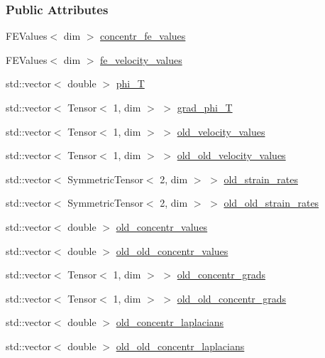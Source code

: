 \subsubsection*{Public Attributes}
\begin{DoxyCompactItemize}
\item 
F\+E\+Values$<$ dim $>$ \hyperlink{struct_assembly_1_1_scratch_1_1concentr_r_h_s_a9bc67b73e78fc8615584d194c3b85106}{concentr\+\_\+fe\+\_\+values}
\item 
F\+E\+Values$<$ dim $>$ \hyperlink{struct_assembly_1_1_scratch_1_1concentr_r_h_s_ad2de28d5b653c8ee22e96ea33c32c55a}{fe\+\_\+velocity\+\_\+values}
\item 
std\+::vector$<$ double $>$ \hyperlink{struct_assembly_1_1_scratch_1_1concentr_r_h_s_acba65db7ab7aece30027901e3b0f030a}{phi\+\_\+\+T}
\item 
std\+::vector$<$ Tensor$<$ 1, dim $>$ $>$ \hyperlink{struct_assembly_1_1_scratch_1_1concentr_r_h_s_a6168fae7e16f02fb680dd33d4adf7b3c}{grad\+\_\+phi\+\_\+\+T}
\item 
std\+::vector$<$ Tensor$<$ 1, dim $>$ $>$ \hyperlink{struct_assembly_1_1_scratch_1_1concentr_r_h_s_a387df4b1d77c791fa36096d021da90b0}{old\+\_\+velocity\+\_\+values}
\item 
std\+::vector$<$ Tensor$<$ 1, dim $>$ $>$ \hyperlink{struct_assembly_1_1_scratch_1_1concentr_r_h_s_a7914c7c1d8f2232465ff96be67aecc93}{old\+\_\+old\+\_\+velocity\+\_\+values}
\item 
std\+::vector$<$ Symmetric\+Tensor$<$ 2, dim $>$ $>$ \hyperlink{struct_assembly_1_1_scratch_1_1concentr_r_h_s_ac8bb5dab7eeb953de8020714bf306e0c}{old\+\_\+strain\+\_\+rates}
\item 
std\+::vector$<$ Symmetric\+Tensor$<$ 2, dim $>$ $>$ \hyperlink{struct_assembly_1_1_scratch_1_1concentr_r_h_s_ac722877b3d573cc39c3503a9b2607004}{old\+\_\+old\+\_\+strain\+\_\+rates}
\item 
std\+::vector$<$ double $>$ \hyperlink{struct_assembly_1_1_scratch_1_1concentr_r_h_s_a58249a4ae522e0e939e0260983be8e14}{old\+\_\+concentr\+\_\+values}
\item 
std\+::vector$<$ double $>$ \hyperlink{struct_assembly_1_1_scratch_1_1concentr_r_h_s_ab7f32838f72a67cf1fd4a837d790bae9}{old\+\_\+old\+\_\+concentr\+\_\+values}
\item 
std\+::vector$<$ Tensor$<$ 1, dim $>$ $>$ \hyperlink{struct_assembly_1_1_scratch_1_1concentr_r_h_s_a0b35928e795a32329965539123ffe0fd}{old\+\_\+concentr\+\_\+grads}
\item 
std\+::vector$<$ Tensor$<$ 1, dim $>$ $>$ \hyperlink{struct_assembly_1_1_scratch_1_1concentr_r_h_s_a8604e75641eb86196bda5d51d2d0bc02}{old\+\_\+old\+\_\+concentr\+\_\+grads}
\item 
std\+::vector$<$ double $>$ \hyperlink{struct_assembly_1_1_scratch_1_1concentr_r_h_s_ad65f167402d66f381aa6a847e223efc6}{old\+\_\+concentr\+\_\+laplacians}
\item 
std\+::vector$<$ double $>$ \hyperlink{struct_assembly_1_1_scratch_1_1concentr_r_h_s_a42468e166f46196231a07b524345670a}{old\+\_\+old\+\_\+concentr\+\_\+laplacians}
\end{DoxyCompactItemize}


